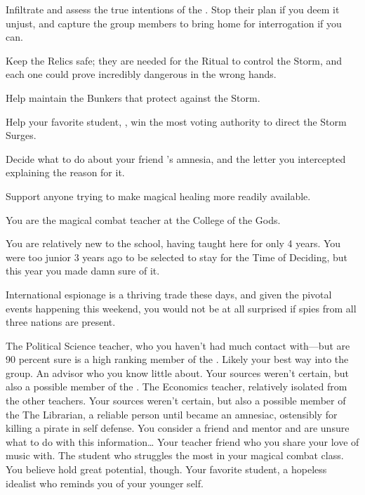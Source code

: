 \documentclass[char]{GL2020}
\begin{document}
\begin{itemz}
	\item Infiltrate and assess the true intentions of the \pGoaties{}. Stop their plan if you deem it unjust, and capture the group members to bring home for interrogation if you can.
	\item Keep the Relics safe; they are needed for the Ritual to control the Storm, and each one could prove incredibly dangerous in the wrong hands.
	\item Help \cBunker{} maintain the Bunkers that protect against the Storm.
	\item Help your favorite student, \cDisney{}, win the most voting authority to direct the Storm Surges.
\item Decide what to do about your friend \cLibrarian{}'s amnesia, and the letter you intercepted explaining the reason for it.
	\item Support anyone trying to make magical healing more readily available.
\end{itemz}

\begin{itemz}[Notes]
	\item You are the magical combat teacher at the College of the Gods.
	\item You are relatively new to the school, having taught here for only 4 years. You were too junior 3 years ago to be selected to stay for the Time of Deciding, but this year you made damn sure of it.
	\item International espionage is a thriving trade these days, and given the pivotal events happening this weekend, you would not be at all surprised if spies from all three nations are present.
\end{itemz}

\begin{contacts}
	\contact{\cChupInventor{}} The Political Science teacher, who you haven't had much contact with---but are 90 percent sure is a high ranking member of the \pGoaties{}. Likely your best way into the group.
\contact{\cWildCard{}} An advisor who you know little about. Your sources weren't certain, but also a possible member of the \pGoaties{}.
	\contact{\cChupSecond{}} The Economics teacher, relatively isolated from the other teachers. Your sources weren't certain, but also a possible member of the \pGoaties{}
	\contact{\cLibrarian{}} The Librarian, a reliable person until \cLibrarian{\they} became an amnesiac, ostensibly for killing a pirate in self defense. You consider \cLibrarian{\them} a friend and mentor and are unsure what to do with this information\ldots{}
	\contact{\cMusic{}} Your teacher friend who you share your love of music with.
	\contact{\cAdopted{}} The student who struggles the most in your magical combat class. You believe \cAdopted{\they} hold great potential, though.
	\contact{\cDisney{}} Your favorite student, a hopeless idealist who reminds you of your younger self.
\end{contacts}
\end{document}
